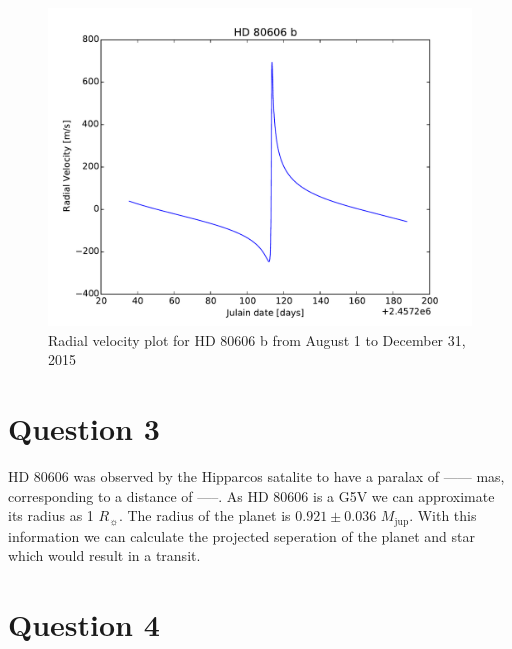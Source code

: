 \documentclass[preprint]{aastex}
\begin{document}
\begin{figure}[h]
\begin{center}
    \includegraphics[width=\textwidth]{Q2.pdf}
    \caption{Radial velocity plot for HD 80606 b from August 1 to December 31, 2015}
    \label{fig:RV}
\end{center}
\end{figure}

\section{Question 3}

HD 80606 was observed by the Hipparcos satalite to have a paralax of ------ mas, corresponding to a distance of -----. As HD 80606 is a G5V we can approximate its radius as 1 $R_\sun$. The radius of the planet is $0.921\pm0.036$ $M_\mathrm{jup}$. With this information we can calculate the projected seperation of the planet and star which would result in a transit. 

\section{Question 4}



\end{document}
